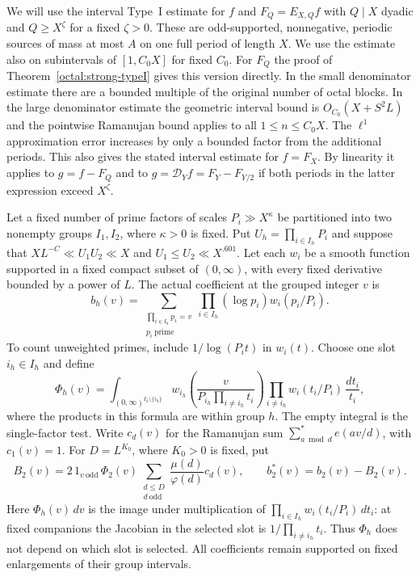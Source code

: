 \documentclass[11pt,a4paper]{article}
\theoremstyle{paperplain}
\numberwithin{equation}{section}
\begin{document}
We will use the interval Type~I estimate for $f$ and
$F_Q=E_{X,Q}f$ with $Q\mid X$ dyadic and $Q\ge X^\zeta$ for a fixed
$\zeta>0$. These are odd-supported, nonnegative, periodic sources of
mass at most $A$ on one full period of length $X$. We use the estimate
also on subintervals of $[1,C_0X]$ for fixed $C_0$. For $F_Q$ the proof
of Theorem~\ref{octal:strong-typeI} gives this version
directly. In the small denominator estimate there are a bounded
multiple of the original number of octal blocks. In the large
denominator estimate the geometric interval bound is
$O_{C_0}(X+S^2L)$ and the pointwise Ramanujan bound applies to all
$1\le n\le C_0X$. The $\ell^1$ approximation error increases by only
a bounded factor from the additional periods. This also gives the
stated interval estimate for $f=F_X$. By linearity it applies to
$g=f-F_Q$ and to $g=\mathcal D_Yf=F_Y-F_{Y/2}$ if both periods in
the latter expression exceed $X^\zeta$.

Let a fixed number of prime factors of scales $P_i\gg X^\kappa$ be
partitioned into two nonempty groups $I_1,I_2$, where $\kappa>0$ is
fixed. Put $U_h=\prod_{i\in I_h}P_i$ and suppose that
$X L^{-C}\ll U_1U_2\ll X$ and $U_1\le U_2\ll X^{.601}$. Let each $w_i$ be
a smooth function supported in a fixed compact subset of $(0,\infty)$,
with every fixed derivative bounded by a power of $L$. The actual
coefficient at the grouped integer $v$ is
\[
 b_h(v)=\sum_{\substack{\prod_{i\in I_h}p_i=v\\ p_i\ \mathrm{prime}}}
                 \prod_{i\in I_h}(\log p_i)w_i(p_i/P_i).
\]
To count unweighted primes, include $1/\log(P_i t)$ in $w_i(t)$.
Choose one slot $i_h\in I_h$ and define
\[
 \Phi_h(v)=\int_{(0,\infty)^{I_h\setminus\{i_h\}}}
   w_{i_h}\left(\frac{v}{P_{i_h}\prod_{i\ne i_h}t_i}\right)
   \prod_{i\ne i_h}w_i(t_i/P_i)\,\frac{dt_i}{t_i},
\]
where the products in this formula are within group $h$. The empty
integral is the single-factor test. Write $c_d(v)$ for the Ramanujan
sum $\sum_{a\bmod d}^{*}e(av/d)$, with $c_1(v)=1$. For $D=L^{K_0}$,
where $K_0>0$ is fixed, put
\begin{equation}\label{eq:principal-grouped-coefficients}
 B_2(v)=2\,1_{v\ \mathrm{odd}}\,\Phi_2(v)
       \sum_{\substack{d\le D\\ d\ \mathrm{odd}}}
                   \frac{\mu(d)}{\varphi(d)}c_d(v),
 \qquad b_2^*(v)=b_2(v)-B_2(v).
\end{equation}
Here $\Phi_h(v)\,dv$ is the image under multiplication of
$\prod_{i\in I_h} w_i(t_i/P_i)\,dt_i$: at fixed companions the
Jacobian in the selected slot is $1/\prod_{i\ne i_h}t_i$.
Thus $\Phi_h$ does not depend on which slot is selected. All coefficients
remain supported on fixed enlargements of their group intervals.
\end{document}
